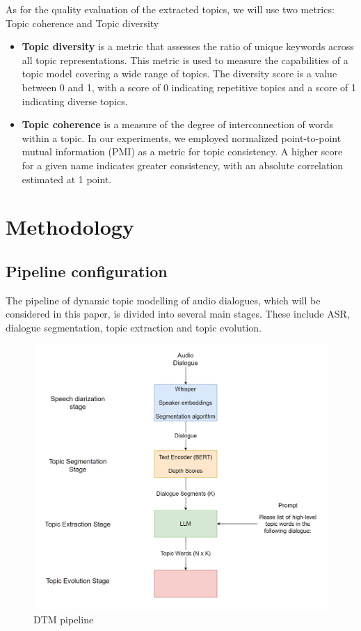 \documentclass[PMI,VKR]{HSEUniversity}
\begin{document}
As for the quality evaluation of the extracted topics, we will use two metrics: Topic coherence and Topic diversity
\begin{itemize}
    \item \textbf{Topic diversity} \cite{topicdiversity:2019} is a metric that assesses the ratio of unique keywords across all topic representations. This metric is used to measure the capabilities of a topic model covering a wide range of topics. The diversity score is a value between 0 and 1, with a score of 0 indicating repetitive topics and a score of 1 indicating diverse topics.
    \item \textbf{Topic coherence} \cite{topiccoh:2009} is a measure of the degree of interconnection of words within a topic. In our experiments, we employed normalized point-to-point mutual information (PMI) as a metric for topic consistency. A higher score for a given name indicates greater consistency, with an absolute correlation estimated at 1 point.
\end{itemize}


\chapter{Methodology}

\section{Pipeline configuration}

The pipeline of dynamic topic modelling of audio dialogues, which will be considered in this paper, is divided into several main stages. 
These include ASR, dialogue segmentation, topic extraction and topic evolution. 

\begin{figure}[h]
    \centering
    \includegraphics[scale=0.7]{img/pipeline.png}
    \caption{DTM pipeline}
\end{figure}
\end{document}
